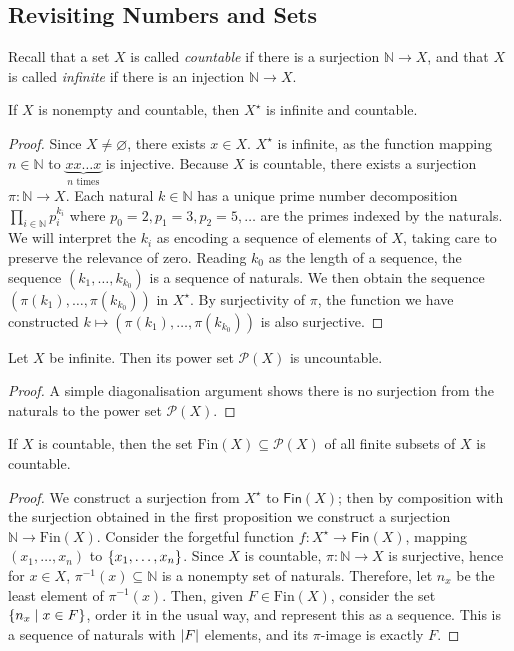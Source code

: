 \subsection{Revisiting Numbers and Sets}
Recall that a set \( X \) is called \emph{countable} if there is a surjection \( \mathbb N \to X \), and that \( X \) is called \emph{infinite} if there is an injection \( \mathbb N \to X \).
\begin{proposition}
	If \( X \) is nonempty and countable, then \( X^\star \) is infinite and countable.
\end{proposition}
\begin{proof}
	Since \( X \neq \varnothing \), there exists \( x \in X \).
	\( X^\star \) is infinite, as the function mapping \( n \in \mathbb N \) to \( \underbrace{xx\dots x}_{n \text{ times}} \) is injective.
	Because \( X \) is countable, there exists a surjection \( \pi : \mathbb N \to X \).
	Each natural \( k \in \mathbb N \) has a unique prime number decomposition \( \prod_{i \in \mathbb N} p_i^{k_i} \) where \( p_0 = 2, p_1 = 3, p_2 = 5, \dots \) are the primes indexed by the naturals.
	We will interpret the \( k_i \) as encoding a sequence of elements of \( X \), taking care to preserve the relevance of zero.
	Reading \( k_0 \) as the length of a sequence, the sequence \( (k_1, \dots, k_{k_0}) \) is a sequence of naturals.
	We then obtain the sequence \( (\pi(k_1), \dots, \pi(k_{k_0})) \) in \( X^\star \).
	By surjectivity of \( \pi \), the function we have constructed \( k \mapsto (\pi(k_1), \dots, \pi(k_{k_0})) \) is also surjective.
\end{proof}
\begin{theorem}
	Let \( X \) be infinite. Then its power set \( \mathcal P(X) \) is uncountable.
\end{theorem}
\begin{proof}
	A simple diagonalisation argument shows there is no surjection from the naturals to the power set \( \mathcal P(X) \).
\end{proof}
\begin{proposition}
	If \( X \) is countable, then the set \( \mathrm{Fin}(X) \subseteq \mathcal P(X) \) of all finite subsets of \( X \) is countable.
\end{proposition}
\begin{proof}
	We construct a surjection from \( X^\star \) to \( \mathsf{Fin}(X) \); then by composition with the surjection obtained in the first proposition we construct a surjection \( \mathbb N \to \mathrm{Fin}(X) \).
	Consider the forgetful function \( f \colon X^\star \to \mathsf{Fin}(X) \), mapping \( (x_1, \dots, x_n) \) to \( \qty{x_1, \dots, x_n} \).
	Since \( X \) is countable, \( \pi \colon \mathbb N \to X \) is surjective, hence for \( x \in X \), \( \pi^{-1}(x) \subseteq \mathbb N \) is a nonempty set of naturals.
	Therefore, let \( n_x \) be the least element of \( \pi^{-1}(x) \).
	Then, given \( F \in \mathrm{Fin}(X) \), consider the set \( \qty{n_x \mid x \in F} \), order it in the usual way, and represent this as a sequence.
	This is a sequence of naturals with \( \abs{F} \) elements, and its \( \pi \)-image is exactly \( F \).
\end{proof}

